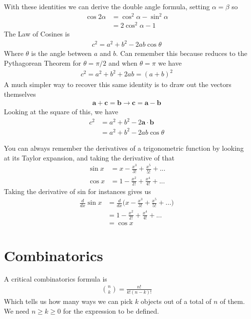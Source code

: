 With these identities we can derive the double angle formula, setting $\alpha = \beta$ so
\begin{align}
\cos2\alpha &= \cos^2\alpha -\sin^2\alpha\\
&= 2\cos^2\alpha-1
\end{align}
The Law of Cosines is 
\begin{align}
c^2 = a^2 + b^2 -2ab\cos\theta
\end{align}
Where $\theta$ is the angle between $a$ and $b$. Can remember this because reduces to the Pythagorean Theorem for $\theta = \pi/2$ and when $\theta = \pi$ we have
\begin{align}
c^2 = a^2 + b^2 +2ab = (a+b)^2
\end{align}
A much simpler way to recover this same identity is to draw out the vectors themselves
\begin{align}
	\textbf{a} + \textbf{c} = \textbf{b} \rightarrow \textbf{c} = \textbf{a} - \textbf{b}
\end{align}
Looking at the square of this, we have
\begin{align}
	c^2 &= a^2 + b^2 - 2\textbf{a}\cdot\textbf{b}\\
	&= a^2 + b^2 -2ab\cos\theta 
\end{align}

You can always remember the derivatives of a trigonometric function by looking at its Taylor expansion, and taking the derivative of that
\begin{align}
	\sin x &= x - \frac{x^3}{3!} + \frac{x^5}{5!} + ...\\
	\cos x &= 1 - \frac{x^2}{2!} + \frac{x^4}{4!} + ...
\end{align}
Taking the derivative of sin for instances gives us
\begin{align}
	\frac{d}{dx}\sin x &= \frac{d}{dx}\Big( x - \frac{x^3}{3!} + \frac{x^5}{5!} + ...\Big)\\
	&= 1 - \frac{x^2}{2!} + \frac{x^4}{4!} + ...\\
	&= \cos x
\end{align}

\section{Combinatorics}
A critical combinatorics formula is 
\begin{align}
\binom{n}{k} = \frac{n!}{k!(n-k)!}
\end{align}
Which tells us how many ways we can pick $k$ objects out of a total of $n$ of them. We need $n \geq k \geq 0$ for the expression to be defined.


